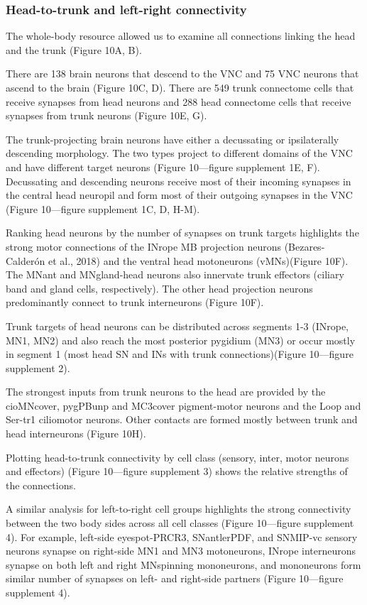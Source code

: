\documentclass[
  11pt,
]{article}
\begin{document}
\subsubsection{Head-to-trunk and left-right
connectivity}\label{head-to-trunk-and-left-right-connectivity}

The whole-body resource allowed us to examine all connections linking
the head and the trunk (Figure 10A, B).

There are 138 brain neurons that descend to the VNC and 75 VNC neurons
that ascend to the brain (Figure 10C, D). There are 549 trunk connectome
cells that receive synapses from head neurons and 288 head connectome
cells that receive synapses from trunk neurons (Figure 10E, G).

The trunk-projecting brain neurons have either a decussating or
ipsilaterally descending morphology. The two types project to different
domains of the VNC and have different target neurons (Figure 10---figure
supplement 1E, F). Decussating and descending neurons receive most of
their incoming synapses in the central head neuropil and form most of
their outgoing synapses in the VNC (Figure 10---figure supplement 1C, D,
H-M).

Ranking head neurons by the number of synapses on trunk targets
highlights the strong motor connections of the INrope MB projection
neurons (Bezares-Calderón et al., 2018) and the ventral head motoneurons
(vMNs)(Figure 10F). The MNant and MNgland-head neurons also innervate
trunk effectors (ciliary band and gland cells, respectively). The other
head projection neurons predominantly connect to trunk interneurons
(Figure 10F).

Trunk targets of head neurons can be distributed across segments 1-3
(INrope, MN1, MN2) and also reach the most posterior pygidium (MN3) or
occur mostly in segment 1 (most head SN and INs with trunk
connections)(Figure 10---figure supplement 2).

The strongest inputs from trunk neurons to the head are provided by the
cioMNcover, pygPBunp and MC3cover pigment-motor neurons and the Loop and
Ser-tr1 ciliomotor neurons. Other contacts are formed mostly between
trunk and head interneurons (Figure 10H).

Plotting head-to-trunk connectivity by cell class (sensory, inter, motor
neurons and effectors) (Figure 10---figure supplement 3) shows the
relative strengths of the connections.

A similar analysis for left-to-right cell groups highlights the strong
connectivity between the two body sides across all cell classes (Figure
10---figure supplement 4). For example, left-side eyespot-PRCR3,
SNantlerPDF, and SNMIP-vc sensory neurons synapse on right-side MN1 and
MN3 motoneurons, INrope interneurons synapse on both left and right
MNspinning mononeurons, and mononeurons form similar number of synapses
on left- and right-side partners (Figure 10---figure supplement 4).
\end{document}
